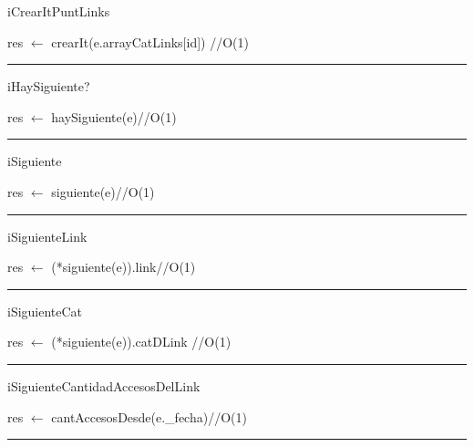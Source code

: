 \begin{algorithm}[H]
\caption{iCrearItPuntLinks}
\begin{algorithmic}[1]
\State res $\gets$ crearIt(e.arrayCatLinks[id]) \hfill //O(1)
\EndFunction 
\end{algorithmic}
\hrule
{}
\end{algorithm}

\begin{algorithm}[H]
\caption{iHaySiguiente?}
\begin{algorithmic}[1]
\state res $\gets$ haySiguiente(e)\hfill //O(1)
\EndFunction 
\end{algorithmic}
\hrule
{}
\end{algorithm}

\begin{algorithm}[H]
\caption{iSiguiente}
\begin{algorithmic}[1]
\state res $\gets$ siguiente(e)\hfill //O(1)
\EndFunction 
\end{algorithmic}
\hrule
{}
\end{algorithm}

\begin{algorithm}[H]
\caption{iSiguienteLink}
\begin{algorithmic}[1]
\state res $\gets$ (*siguiente(e)).link\hfill //O(1)
\EndFunction 
\end{algorithmic}
\hrule
{}
\end{algorithm}


\begin{algorithm}[H]
\caption{iSiguienteCat}
\begin{algorithmic}[1]
\state res $\gets$ (*siguiente(e)).catDLink \hfill //O(1)
\EndFunction 
\end{algorithmic}
\hrule
{}
\end{algorithm}

\begin{algorithm}[H]
\caption{iSiguienteCantidadAccesosDelLink}
\begin{algorithmic}[1]
\state res $\gets$ cantAccesosDesde(e._fecha)\hfill //O(1)
\EndFunction 
\end{algorithmic}
\hrule
{}
\end{algorithm}

